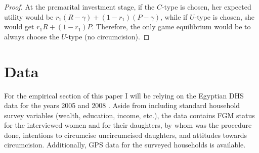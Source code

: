 \documentclass[12pt]{article}
\begin{document}
\begin{proof}
  At the premarital investment stage, if the $C$-type is chosen, her expected utility would be $r_1(R-\gamma) + (1-r_1)(P-\gamma)$, while if $U$-type is chosen, she would get $r_1R + (1-r_1)P$. Therefore, the only game equilibrium would be to always choose the $U$-type (no circumcision).

\end{proof}

\section{Data}\label{sec:data}

For the empirical section of this paper I will be relying on the Egyptian DHS data for the years 2005 and 2008 \citep{El-Zanaty2006, El-Zanat}.  Aside from including standard household survey variables (wealth, education, income, etc.), the data contains FGM status for the interviewed women and for their daughters, by whom was the procedure done, intentions to circumcise uncircumcised daughters, and attitudes towards circumcision. Additionally, GPS data for the surveyed households is available.

\nocite{Refaat}
\nocite{Yount}
\nocite{Hoodfar1997}
\nocite{El-Gibaly2002}



\end{document}
